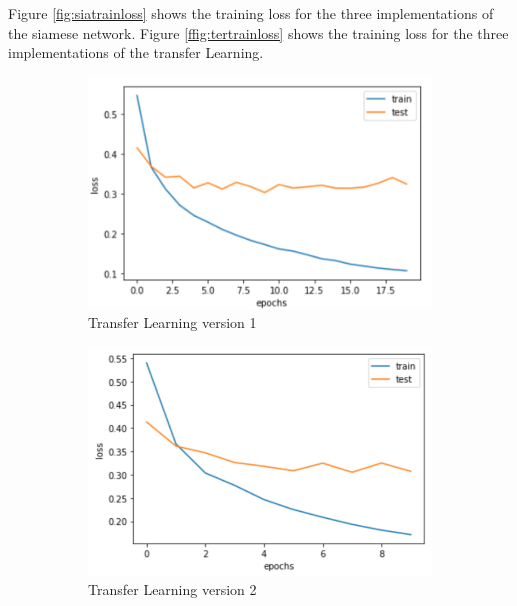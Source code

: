 Figure \ref{fig:siatrainloss} shows the training loss for the three implementations of the siamese network. Figure \ref{ffig:tertrainloss} shows the training loss for the three implementations of the transfer Learning.


\begin{figure}[h]
  \centering
  \begin{subfigure}[b]{0.48\linewidth}
  \includegraphics[width=\linewidth]{figs/transfer_loss.png}
  \caption{Transfer Learning version 1}
  \label{fig:con_loss}
  \end{subfigure}
  \hfill
   \begin{subfigure}[b]{0.48\linewidth}
   \includegraphics[width=\linewidth]{figs/transfer_loss_2.png}
   \caption{Transfer Learning version 2}
   \label{fig:tri_loss}
  \end{subfigure}
    \hfill
    \begin{subfigure}[b]{0.48\linewidth}

\end{subfigure}
\end{figure}
